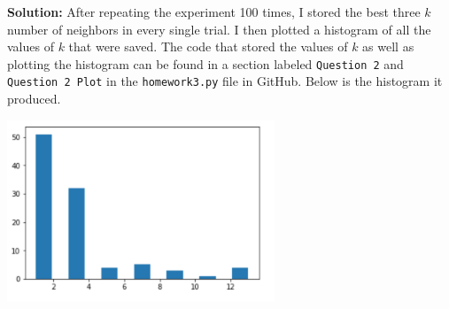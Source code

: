\documentclass[a4paper]{article}
\begin{document}
\textbf{Solution:} After repeating the experiment 100 times, I stored the best three $k$ number 
of neighbors in every single trial.  I then plotted a histogram of all the values of $k$ that 
were saved.  The code that stored the values of $k$ as well as plotting the histogram can be found 
in a section labeled \verb|Question 2| and \verb|Question 2 Plot| in the \verb|homework3.py| file 
in GitHub.  Below is the histogram it produced.
\begin{center}
    \includegraphics[width=0.6\textwidth]{2.jpg}
\end{center}

\end{document}
